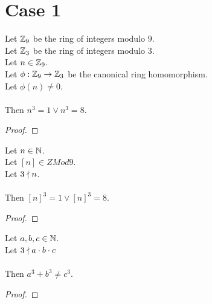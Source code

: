 
\chapter*{Case 1}

\begin{lemma}
  \label{lmm:cube_of_castHom_ne_zero}
  \leanok
  Let $\mathbb{Z}_9$ be the ring of integers modulo $9$. \\
  Let $\mathbb{Z}_3$ be the ring of integers modulo $3$. \\
  Let $n \in \mathbb{Z}_9$. \\
  Let $\phi : \mathbb{Z}_9 \to \mathbb{Z}_3$ be the canonical ring homomorphism. \\
  Let $\phi(n) \neq 0$. \\ \\
  Then $n^3=1 \lor n^3=8$.
\end{lemma}
\begin{proof}
  \leanok
\end{proof}

\begin{lemma}
  \label{lmm:cube_of_not_dvd}
  \leanok
  Let $n \in \mathbb{N}$. \\
  Let $\left[n \right] \in ZMod 9$. \\
  Let $3 \nmid n$. \\ \\
  Then $\left[n \right]^3 = 1 \lor \left[n \right]^3 = 8$.
\end{lemma}
\begin{proof}
  \leanok
\end{proof}

\begin{theorem}
    \label{thm:fermatLastTheoremThree_case_1}
    \leanok
    Let $a, b, c \in \mathbb{N}$. \\
    Let $3 \nmid a \cdot b \cdot c$ \\\\
    Then $a ^ 3 + b ^ 3 \neq c ^ 3$.
\end{theorem}
\begin{proof}
  \leanok
\end{proof}
